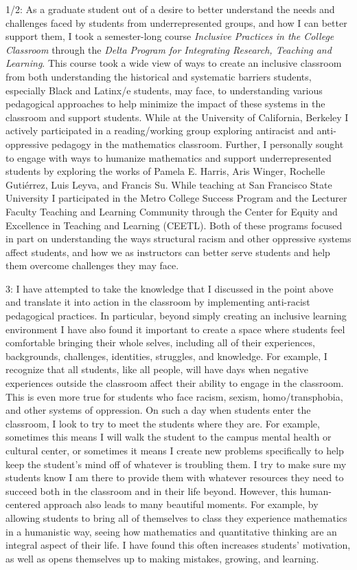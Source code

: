 \documentclass[11pt]{article}
\begin{document}
1/2: As a graduate student out of a desire to better understand the needs and challenges faced by students from underrepresented groups, and how I can better support them, I took a semester-long course \textit{Inclusive Practices in the College Classroom} through the \textit{Delta Program for Integrating Research, Teaching and Learning}. This course took a wide view of ways to create an inclusive classroom from both understanding the historical and systematic barriers students, especially Black and Latinx/e students, may face, to understanding various pedagogical approaches to help minimize the impact of these systems in the classroom and support students. While at the University of California, Berkeley I actively participated in a reading/working group exploring antiracist and anti-oppressive pedagogy in the mathematics classroom. Further, I personally sought to engage with ways to humanize mathematics and support underrepresented students by exploring the works of Pamela E. Harris, Aris Winger, Rochelle Guti\'{e}rrez, Luis Leyva, and Francis Su. While teaching at San Francisco State University I participated in the Metro College Success Program and the Lecturer Faculty Teaching and Learning Community through the Center for Equity and Excellence in Teaching and Learning (CEETL). Both of these programs focused in part on understanding the ways structural racism and other oppressive systems affect students, and how we as instructors can better serve students and help them overcome challenges they may face. 

3: I have attempted to take the knowledge that I discussed in the point above and translate it into action in the classroom by implementing anti-racist pedagogical practices. In particular, beyond simply creating an inclusive learning environment I have also found it important to create a space where students feel comfortable bringing their whole selves, including all of their experiences, backgrounds, challenges, identities, struggles, and knowledge. For example, I recognize that all students, like all people, will have days when negative experiences outside the classroom affect their ability to engage in the classroom. This is even more true for students who face racism, sexism, homo/transphobia, and other systems of oppression. On such a day when students enter the classroom, I look to try to meet the students where they are. For example, sometimes this means I will walk the student to the campus mental health or cultural center, or sometimes it means I create new problems specifically to help keep the student's mind off of whatever is troubling them. I try to make sure my students know I am there to provide them with whatever resources they need to succeed both in the classroom and in their life beyond. However, this human-centered approach also leads to many beautiful moments. For example, by allowing students to bring all of themselves to class they experience mathematics in a humanistic way, seeing how mathematics and quantitative thinking are an integral aspect of their life. I have found this often increases students' motivation, as well as opens themselves up to making mistakes, growing, and learning. 
\end{document}
